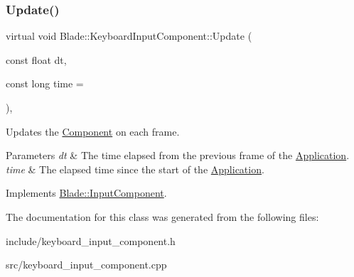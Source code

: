 \subsubsection{\texorpdfstring{Update()}{Update()}}
{\footnotesize\ttfamily virtual void Blade\+::\+Keyboard\+Input\+Component\+::\+Update (\begin{DoxyParamCaption}\item[{const float}]{dt,  }\item[{const long}]{time = {} }\end{DoxyParamCaption})\hspace{0.3cm}{\ttfamily [pure virtual]}, {\ttfamily [noexcept]}}



Updates the \hyperlink{class_blade_1_1_component}{Component} on each frame. 


\begin{DoxyParams}{Parameters}
{\em dt} & The time elapsed from the previous frame of the \hyperlink{class_blade_1_1_application}{Application}. \\
\hline
{\em time} & The elapsed time since the start of the \hyperlink{class_blade_1_1_application}{Application}. \\
\hline
\end{DoxyParams}


Implements \hyperlink{class_blade_1_1_input_component_aa7869b52200bb0a8c0c304fdf6147098}{Blade\+::\+Input\+Component}.



The documentation for this class was generated from the following files\+:\begin{DoxyCompactItemize}
\item 
include/keyboard\+\_\+input\+\_\+component.\+h\item 
src/keyboard\+\_\+input\+\_\+component.\+cpp\end{DoxyCompactItemize}
